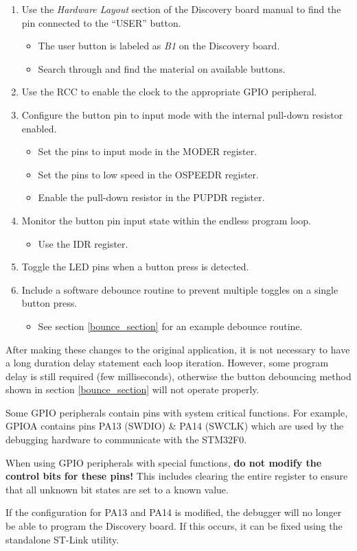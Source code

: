 \documentclass[11pt,fleqn]{book} %
\begin{document}
\begin{enumerate}
    \item Use the \textit{Hardware Layout} section of the Discovery board manual to find the pin connected to the ``USER'' button.
    \begin{itemize}
        \item The user button is labeled as \textit{B1} on the Discovery board.
        \item Search through and find the material on available buttons. 
    \end{itemize}
    \item Use the RCC to enable the clock to the appropriate GPIO peripheral.
    \item Configure the button pin to input mode with the internal pull-down resistor enabled.
    \begin{itemize}
        \item Set the pins to input mode in the MODER register. 
        \item Set the pins to low speed in the OSPEEDR register. 
        \item Enable the pull-down resistor in the PUPDR register. 
    \end{itemize}
    \item Monitor the button pin input state within the endless program loop.
    \begin{itemize}
        \item Use the IDR register.  
    \end{itemize}
    \item Toggle the LED pins when a button press is detected.
    \item Include a software debounce routine to prevent multiple toggles on a single button press.
    \begin{itemize}
        \item See section \vref{bounce_section} for an example debounce routine. 
    \end{itemize}
\end{enumerate}

After making these changes to the original application, it is not necessary to have a long duration delay statement each loop iteration. However, some program delay is still required (few milliseconds), otherwise the button debouncing method shown in section \vref{bounce_section} will not operate properly. 

\begin{warning}
    Some GPIO peripherals contain pins with system critical functions. For example, GPIOA contains pins PA13 (SWDIO) \& PA14 (SWCLK) which are used by the debugging hardware to communicate with the STM32F0. 
    
    When using GPIO peripherals with special functions, \textbf{do not modify the control bits for these pins!} This includes clearing the entire register to ensure that all unknown bit states are set to a known value. 
    
    If the configuration for PA13 and PA14 is modified, the debugger will no longer be able to program the Discovery board. If this occurs, it can be fixed using the standalone ST-Link utility.
\end{warning}
\end{document}
